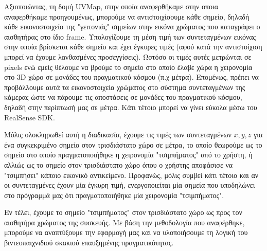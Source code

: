Αξιοποιώντας, τη δομή UVMap, στην οποία αναφερθήκαμε στην οποια αναφερθήκαμε προηγουμένως, μπορούμε να αντιστοιχίσουμε κάθε σημείο, δηλαδή κάθε εικονοστοιχείο της "γειτονιάς" σημείων στην εικόνα χρώματος που καταγράφει ο αισθητήρας στο ίδιο frame. Υπολογίζουμε τη μέση τιμή των συντεταγμένων εικόνας στην οποία βρίσκεται κάθε σημείο και έχει έγκυρες τιμές (αφού κατά την αντιστοίχιση μπορεί να έχουμε λανθασμένες προσεγγίσεις). Ωστόσο οι τιμές αυτές μετρώνται σε pixels ενώ εμείς θέλουμε να βρούμε το σημείο στο οποίο έλαβε χώρα η χειρονομία στο 3D χώρο σε μονάδες του πραγματικού κόσμου (π.χ μέτρα). Επομένως, πρέπει να προβάλλουμε αυτά τα εικονοστοιχεία χρώματος στο σύστημα συντεταγμένων της κάμερας ώστε να πάρουμε τις αποστάσεις σε μονάδες του πραγματικού κόσμου, δηλαδή στην περίπτωσή μας σε μέτρα. Κάτι τέτοιο μπορεί να γίνει εύκολα μέσω του RealSense SDK.


Μόλις ολοκληρωθεί αυτή η διαδικασία, έχουμε τις τιμές των συντεταγμένων $x,y,z$ για ένα συγκεκριμένο σημείο στον τρισδιάστατο χώρο σε μέτρα, το οποίο θεωρούμε ως το σημείο στο οποίο πραγματοποιήθηκε η χειρονομία "τσιμπήματος" από το χρήστη, ή αλλιώς ως το σημείο στον τρισδιάστατο χώρο όπου ο χρήστης αποφάσισε να "τσιμπήσει" κάποιο εικονικό αντικείμενο. Προφανώς, μόλις συμβεί κάτι τέτοιο και αν οι συντεταγμένες έχουν μία έγκυρη τιμή, ενεργοποιείται μία σημεία που υποδηλώνει στο πρόγραμμά μας ότι πραγματοποιήθηκε μία χειρονομία "τσιμπήματος". 

Εν τέλει, έχουμε το σημείο "τσιμπήματος" στον τρισδιάστατο χώρο ως προς τον αισθητήρα χρώματος της συσκευής. Με βάση την μεθοδολογία που αναφέρθηκε, μπορούμε να αναπτύξουμε την εφαρμογή μας και να υλοποιήσουμε τη λογική του βιντεοπαιχνιδιού σκακιού επαυξημένης πραγματικότητας. 




